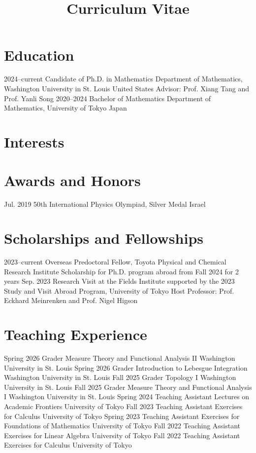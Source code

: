 \documentclass[11pt,a4paper,roman]{moderncv}
\title{Curriculum Vitae}
\begin{document}
\makecvtitle

\section{Education}
\cventry
  {2024--current}
  {Candidate of Ph.D. in Mathematics}
  {Department of Mathematics, Washington University in St. Louis}
  {United States}
  {}
  {Advisor: Prof. Xiang Tang and Prof. Yanli Song}
\cventry
  {2020--2024}
  {Bachelor of Mathematics}
  {Department of Mathematics, University of Tokyo}
  {Japan}
  {}
  {}

\section{Interests}

\section{Awards and Honors}
\cventry
  {Jul. 2019}
  {50th International Physics Olympiad, Silver Medal}
  {}
  {Israel}
  {}
  {}

\section{Scholarships and Fellowships}
\cventry
  {2023--current}
  {Overseas Predoctoral Fellow, Toyota Physical and Chemical Research Institute}
  {}
  {}
  {}
  {Scholarship for Ph.D. program abroad from Fall 2024 for 2 years}
\cventry
  {Sep. 2023}
  {Research Visit at the Fields Institute}
  {}
  {supported by the 2023 Study and Visit Abroad Program, University of Tokyo}
  {}
  {Host Professor: Prof. Eckhard Meinrenken and Prof. Nigel Higson}

\section{Teaching Experience}
\cventry
  {Spring 2026}
  {Grader}
  {Measure Theory and Functional Analysis II}
  {Washington University in St. Louis}
  {}
  {}
\cventry
  {Spring 2026}
  {Grader}
  {Introduction to Lebesgue Integration}
  {Washington University in St. Louis}
  {}
  {}
\cventry
  {Fall 2025}
  {Grader}
  {Topology I}
  {Washington University in St. Louis}
  {}
  {}
\cventry
  {Fall 2025}
  {Grader}
  {Measure Theory and Functional Analysis I}
  {Washington University in St. Louis}
  {}
  {}
\cventry
  {Spring 2024}
  {Teaching Assistant}
  {Lectures on Academic Frontiers}
  {University of Tokyo}
  {}
  {}
\cventry
  {Fall 2023}
  {Teaching Assistant}
  {Exercises for Calculus}
  {University of Tokyo}
  {}
  {}
\cventry
  {Spring 2023}
  {Teaching Assistant}
  {Exercises for Foundations of Mathematics}
  {University of Tokyo}
  {}
  {}
\cventry
  {Fall 2022}
  {Teaching Assistant}
  {Exercises for Linear Algebra}
  {University of Tokyo}
  {}
  {}
\cventry
  {Fall 2022}
  {Teaching Assistant}
  {Exercises for Calculus}
  {University of Tokyo}
  {}
  {}
\end{document}
